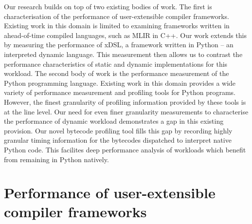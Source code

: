 Our research builds on top of two existing bodies of work.
The first is characterisation of the performance of user-extensible compiler frameworks. Existing work in this domain is limited to examining frameworks written in ahead-of-time compiled languages, such as MLIR in C++.
Our work extends this by measuring the performance of xDSL, a framework written in Python -- an interpreted dynamic language. This measurement then allows us to contrast the performance characteristics of static and dynamic implementations for this workload.
The second body of work is the performance measurement of the Python programming language. Existing work in this domain provides a wide variety of performance measurement and profiling tools for Python programs. However, the finest granularity of profiling information provided by these tools is at the line level. Our need for even finer granularity measurements to characterise the performance of dynamic workload demonstrates a gap in this existing provision.
Our novel bytecode profiling tool fills this gap by recording highly granular timing information for the bytecodes dispatched to interpret native Python code. This facilites deep performance analysis of workloads which benefit from remaining in Python natively.





\section{Performance of user-extensible compiler frameworks}
\label{sec:perf-user-extensible-frameworks}

